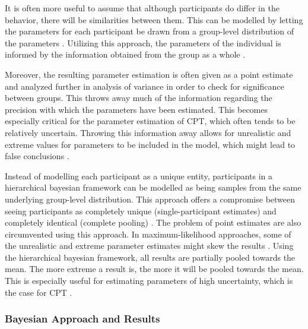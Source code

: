 \documentclass{article}
\begin{document}
It is often more useful to assume that although participants do differ in the behavior, there will be similarities between them. This can be modelled by letting the parameters for each participant be drawn from a group-level distribution of the parameters \cite{nilsson2011jomp}. Utilizing this approach, the parameters of the individual is informed by the information obtained from the group as a whole \cite{nilsson2011jomp}.

Moreover, the resulting parameter estimation is often given as a point estimate and analyzed further in analysis of variance in order to check for significance between groups. This throws away much of the information regarding the precision with which the parameters have been estimated. This becomes especially critical for the parameter estimation of CPT, which often tends to be relatively uncertain. Throwing this information away allows for unrealistic and extreme values for parameters to be included in the model, which might lead to false conclusions \cite{nilsson2011jomp}. 

Instead of modelling each participant as a unique entity, participants in a hierarchical bayesian framework can be modelled as being samples from the same underlying group-level distribution. This approach offers a compromise between seeing participants as completely unique (single-participant estimates) and completely identical (complete pooling) \cite{nilsson2011jomp}. The problem of point estimates are also circumvented using this approach. In maximum-likelihood approaches, some of the unrealistic and extreme parameter estimates might skew the results \cite{nilsson2011jomp}. Using the hierarchical bayesian framework, all results are partially pooled towards the mean. The more extreme a result is, the more it will be pooled towards the mean. This is especially useful for estimating parameters of high uncertainty, which is the case for CPT \cite{nilsson2011jomp}. 

    \subsubsection{Bayesian Approach and Results}
\end{document}
